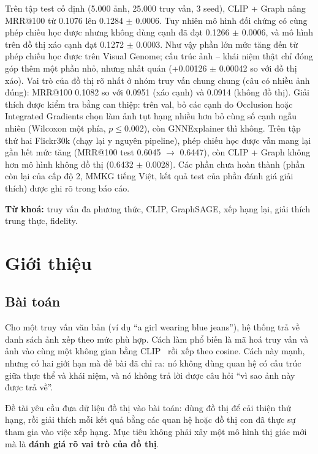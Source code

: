 \documentclass[12pt, a4paper]{article}
\makeatletter
\newcommand{\mrr}{MRR@100}
\newcommand{\pmm}{\ensuremath{\pm}}
\makeatother
\begin{document}
Trên tập test cố định (5.000 ảnh, 25.000 truy vấn, 3 seed), CLIP + Graph nâng \mrr{} từ 0.1076 lên 0.1284 \pmm{} 0.0006. Tuy nhiên mô hình đối chứng có cùng phép chiếu học được nhưng không dùng cạnh đã đạt 0.1266 \pmm{} 0.0006, và mô hình trên đồ thị xáo cạnh đạt 0.1272 \pmm{} 0.0003. Như vậy phần lớn mức tăng đến từ phép chiếu học được trên Visual Genome; cấu trúc ảnh -- khái niệm thật chỉ đóng góp thêm một phần nhỏ, nhưng nhất quán (+0.00126 \pmm{} 0.00042 so với đồ thị xáo). Vai trò của đồ thị rõ nhất ở nhóm truy vấn chung chung (câu có nhiều ảnh đúng): \mrr{} 0.1082 so với 0.0951 (xáo cạnh) và 0.0914 (không đồ thị). Giải thích được kiểm tra bằng can thiệp: trên val, bỏ các cạnh do Occlusion hoặc Integrated Gradients chọn làm ảnh tụt hạng nhiều hơn bỏ cùng số cạnh ngẫu nhiên (Wilcoxon một phía, $p\le 0.002$), còn GNNExplainer thì không. Trên tập thứ hai Flickr30k (chạy lại y nguyên pipeline), phép chiếu học được vẫn mang lại gần hết mức tăng (\mrr{} test 0.6045 $\to$ 0.6447), còn CLIP + Graph không hơn mô hình không đồ thị (0.6432 \pmm{} 0.0028). Các phần chưa hoàn thành (phần còn lại của cấp độ 2, MMKG tiếng Việt, kết quả test của phần đánh giá giải thích) được ghi rõ trong báo cáo.

\vspace{0.3cm}
\noindent\textbf{Từ khoá:} truy vấn đa phương thức, CLIP, GraphSAGE, xếp hạng lại, giải thích trung thực, fidelity.


\section{Giới thiệu}

\subsection{Bài toán}
Cho một truy vấn văn bản (ví dụ ``a girl wearing blue jeans''), hệ thống trả về danh sách ảnh xếp theo mức phù hợp. Cách làm phổ biến là mã hoá truy vấn và ảnh vào cùng một không gian bằng CLIP~\cite{radford2021clip} rồi xếp theo cosine. Cách này mạnh, nhưng có hai giới hạn mà đề bài đã chỉ ra: nó không dùng quan hệ có cấu trúc giữa thực thể và khái niệm, và nó không trả lời được câu hỏi ``vì sao ảnh này được trả về''.

Đề tài yêu cầu đưa dữ liệu đồ thị vào bài toán: dùng đồ thị để cải thiện thứ hạng, rồi giải thích mỗi kết quả bằng các quan hệ hoặc đồ thị con đã thực sự tham gia vào việc xếp hạng. Mục tiêu không phải xây một mô hình thị giác mới mà là \textbf{đánh giá rõ vai trò của đồ thị}.
\end{document}
